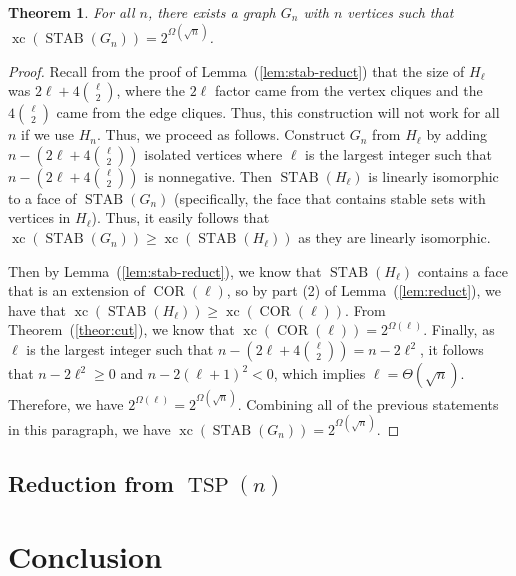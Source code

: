 \documentclass{article}
\newtheorem{theorem}{\sc Theorem}
\theoremstyle{definition}
\theoremstyle{remark}
\newcommand{\xc}{\operatorname{xc}}
\newcommand{\TSP}{\operatorname{TSP}}
\newcommand{\STAB}{\operatorname{STAB}}
\newcommand{\COR}{\operatorname{COR}}
\begin{document}
\begin{theorem}\label{thm:stab-reduct}
For all $n$, there exists a graph $G_n$ with $n$ vertices such that $\xc(\STAB(G_n)) = 2^{\Omega(\sqrt{n})}$.
\end{theorem}
\begin{proof}
Recall from the proof of Lemma~(\ref{lem:stab-reduct}) that the size of $H_\ell$ was $2\ell + 4\binom{\ell}{2}$, where the $2\ell$ factor came from the vertex cliques and the $4\binom{\ell}{2}$ came from the edge cliques. Thus, this construction will not work for all $n$ if we use $H_n$. Thus, we proceed as follows. Construct $G_n$ from $H_\ell$ by adding $n - (2\ell + 4\binom{\ell}{2})$ isolated vertices where $\ell$ is the largest integer such that $n - (2\ell + 4\binom{\ell}{2})$ is nonnegative. Then $\STAB(H_\ell)$ is linearly isomorphic to a face of $\STAB(G_n)$ (specifically, the face that contains stable sets with vertices in $H_\ell$). Thus, it easily follows that $\xc(\STAB(G_n)) \ge \xc(\STAB(H_\ell))$ as they are linearly isomorphic.

Then by Lemma~(\ref{lem:stab-reduct}), we know that $\STAB(H_\ell)$ contains a face that is an extension of $\COR(\ell)$, so by part (2) of Lemma~(\ref{lem:reduct}), we have that $\xc(\STAB(H_\ell)) \ge \xc(\COR(\ell))$. From Theorem~(\ref{theor:cut}), we know that $\xc(\COR(\ell)) = 2^{\Omega(\ell)}$. Finally, as $\ell$ is the largest integer such that $n - (2\ell + 4\binom{\ell}{2}) = n - 2\ell^2$, it follows that $n - 2\ell^2 \ge 0$ and $n - 2(\ell + 1)^2 < 0$, which implies $\ell = \Theta(\sqrt{n})$. Therefore, we have $2^{\Omega(\ell)} = 2^{\Omega(\sqrt{n})}$. Combining all of the previous statements in this paragraph, we have $\xc(\STAB(G_n)) = 2^{\Omega(\sqrt{n})}$.
\end{proof}

\subsection{Reduction from $\TSP(n)$}


\section{Conclusion}



\end{document}
